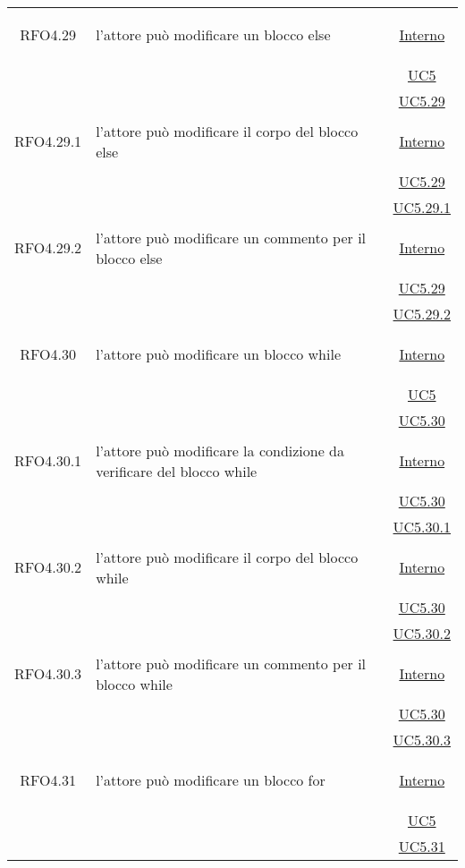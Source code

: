 \begin{longtable}{|c|>{\centering}m{7cm}|c|}
\hypertarget{RFO4.29}{RFO4.29} & l'attore può modificare un blocco else & \hyperlink{Interno}{Interno}\\
& &\hyperref[UC5]{UC5}\\
& &\hyperref[UC5.29]{UC5.29}\\ \hline

\hypertarget{RFO4.29.1}{RFO4.29.1} & l'attore può modificare il corpo del blocco else &\hyperlink{Interno}{Interno}\\
& &\hyperref[UC5.29]{UC5.29}\\
& &\hyperref[UC5.29.1]{UC5.29.1}\\ \hline

\hypertarget{RFO4.29.2}{RFO4.29.2} & l'attore può modificare un commento per il blocco else & \hyperlink{Interno}{Interno}\\
& &\hyperref[UC5.29]{UC5.29}\\
& &\hyperref[UC5.29.2]{UC5.29.2}\\ \hline

\hypertarget{RFO4.30}{RFO4.30} & l'attore può modificare un blocco while & \hyperlink{Interno}{Interno}\\
& &\hyperref[UC5]{UC5}\\
& &\hyperref[UC5.30]{UC5.30}\\ \hline

\hypertarget{RFO4.30.1}{RFO4.30.1} & l'attore può modificare la condizione da verificare del blocco while & \hyperlink{Interno}{Interno}\\
& &\hyperref[UC5.30]{UC5.30}\\
& &\hyperref[UC5.30.1]{UC5.30.1}\\ \hline

\hypertarget{RFO4.30.2}{RFO4.30.2} & l'attore può modificare il corpo del blocco while & \hyperlink{Interno}{Interno}\\
& &\hyperref[UC5.30]{UC5.30}\\
& &\hyperref[UC5.30.2]{UC5.30.2}\\ \hline

\hypertarget{RFO4.30.3}{RFO4.30.3} & l'attore può modificare un commento per il blocco while & \hyperlink{Interno}{Interno}\\
& &\hyperref[UC5.30]{UC5.30}\\
& &\hyperref[UC5.30.3]{UC5.30.3}\\ \hline

\hypertarget{RFO4.31}{RFO4.31} & l'attore può modificare un blocco for &  \hyperlink{Interno}{Interno}\\
& &\hyperref[UC5]{UC5}\\
& &\hyperref[UC5.31]{UC5.31}\\ \hline


\end{longtable}
